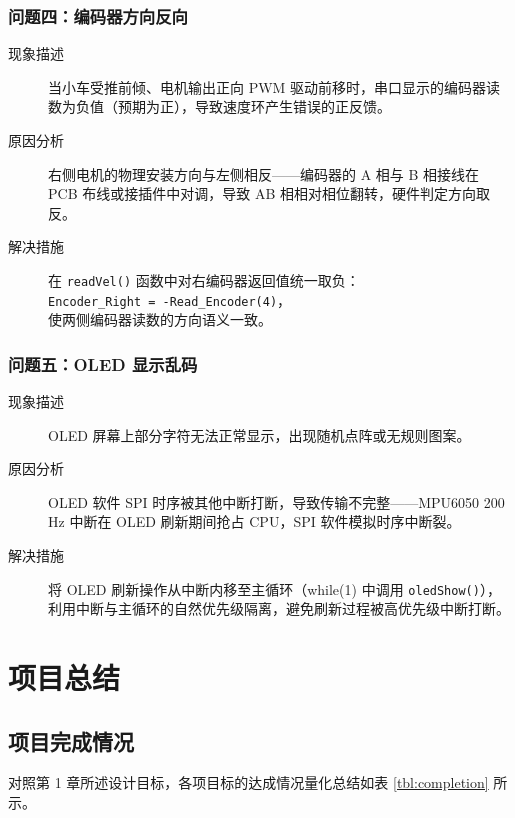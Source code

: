 \documentclass[12pt,a4paper,UTF8]{ctexrep}
\begin{document}
\subsection{问题四：编码器方向反向}

\begin{description}
  \item[现象描述] 当小车受推前倾、电机输出正向 PWM 驱动前移时，串口显示的编码器读数为负值（预期为正），导致速度环产生错误的正反馈。
  \item[原因分析] 右侧电机的物理安装方向与左侧相反——编码器的 A 相与 B 相接线在 PCB 布线或接插件中对调，导致 AB 相相对相位翻转，硬件判定方向取反。
  \item[解决措施] 在 \texttt{readVel()} 函数中对右编码器返回值统一取负：\\[2pt]
      \texttt{Encoder\_Right = -Read\_Encoder(4)}，\\[2pt]
      使两侧编码器读数的方向语义一致。
\end{description}

\subsection{问题五：OLED 显示乱码}

\begin{description}
  \item[现象描述] OLED 屏幕上部分字符无法正常显示，出现随机点阵或无规则图案。
  \item[原因分析] OLED 软件 SPI 时序被其他中断打断，导致传输不完整——MPU6050 200\,Hz 中断在 OLED 刷新期间抢占 CPU，SPI 软件模拟时序中断裂。
  \item[解决措施] 将 OLED 刷新操作从中断内移至主循环（while(1) 中调用 \texttt{oledShow()}），利用中断与主循环的自然优先级隔离，避免刷新过程被高优先级中断打断。
\end{description}

\chapter{项目总结}

\section{项目完成情况}

对照第 1 章所述设计目标，各项目标的达成情况量化总结如表 \ref{tbl:completion} 所示。
\end{document}
